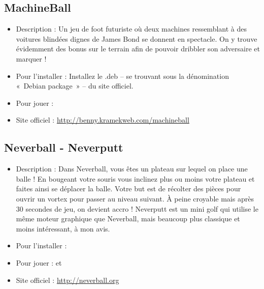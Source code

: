 \subsection{MachineBall}
\begin{itemize}
\begingroup
{}
\item Description : Un jeu de foot futuriste où deux machines ressemblant à des voitures blindées dignes de James Bond se donnent en spectacle. On y trouve évidemment des bonus sur le terrain afin de pouvoir dribbler son adversaire et marquer !{\par}
\endgroup
\item Pour l'installer : Installez le .deb -- se trouvant sous la dénomination «~Debian package~» -- du site officiel.{\par}
\item Pour jouer : 
\item Site officiel : \url{http://benny.kramekweb.com/machineball}{\par}
\end{itemize}
\subsection{Neverball - Neverputt}
\begin{itemize}
\begingroup
{}
\item Description : Dans Neverball, vous êtes un plateau sur lequel on place une balle ! En bougeant votre souris vous inclinez plus ou moins votre plateau et faites ainsi se déplacer la balle. Votre but est de récolter des pièces pour ouvrir un vortex pour passer au niveau suivant. À peine croyable mais après 30 secondes de jeu, on devient accro ! Neverputt est un mini golf qui utilise le même moteur graphique que Neverball, mais beaucoup plus classique et moins intéressant, à mon avis.{\par}
\item Pour l'installer : 
\item Pour jouer :  et 
\item Site officiel : \url{http://neverball.org}{\par}
\endgroup
\end{itemize}
\newpage
